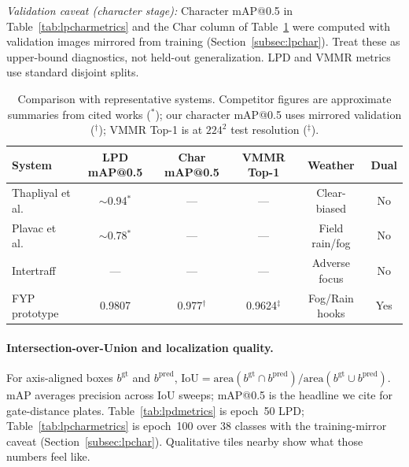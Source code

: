 \documentclass[10pt, conference]{IEEEtran}
\begin{document}
\par\vspace{2pt}\noindent\footnotesize\textit{Validation caveat (character stage):} Character mAP@0.5 in Table~\ref{tab:lpcharmetrics} and the Char column of Table~\ref{tab:cmp} were computed with validation images mirrored from training (Section~\ref{subsec:lpchar}). Treat these as upper-bound diagnostics, not held-out generalization. LPD and VMMR metrics use standard disjoint splits.\par\vspace{4pt}

\begin{table}[!htbp]
\centering
\caption{Comparison with representative systems. Competitor figures are approximate summaries from cited works ($^\ast$); our character mAP@0.5 uses mirrored validation ($^\dagger$); VMMR Top-1 is at $224^2$ test resolution ($^\ddagger$).}
\label{tab:cmp}
\begin{tabular}{@{}lccccc@{}}
\toprule
System & LPD mAP@0.5 & Char mAP@0.5 & VMMR Top-1 & Weather & Dual \\
\midrule
Thapliyal et al.~\cite{r01} & $\sim$0.94$^\ast$ & --- & --- & Clear-biased & No \\
Plavac et al.~\cite{r05} & $\sim$0.78$^\ast$ & --- & --- & Field rain/fog & No \\
Intertraff~\cite{r10} & --- & --- & --- & Adverse focus & No \\
FYP prototype & 0.9807 & 0.977$^\dagger$ & 0.9624$^\ddagger$ & Fog/Rain hooks & Yes \\
\bottomrule
\end{tabular}
\end{table}

\paragraph{Intersection-over-Union and localization quality.}
For axis-aligned boxes $b^{\mathrm{gt}}$ and $b^{\mathrm{pred}}$, $\mathrm{IoU} = \mathrm{area}(b^{\mathrm{gt}} \cap b^{\mathrm{pred}}) / \mathrm{area}(b^{\mathrm{gt}} \cup b^{\mathrm{pred}})$. mAP averages precision across IoU sweeps; mAP@0.5 is the headline we cite for gate-distance plates. Table~\ref{tab:lpdmetrics} is epoch~50 LPD; Table~\ref{tab:lpcharmetrics} is epoch~100 over 38 classes with the training-mirror caveat (Section~\ref{subsec:lpchar}). Qualitative tiles nearby show what those numbers feel like.
\end{document}
